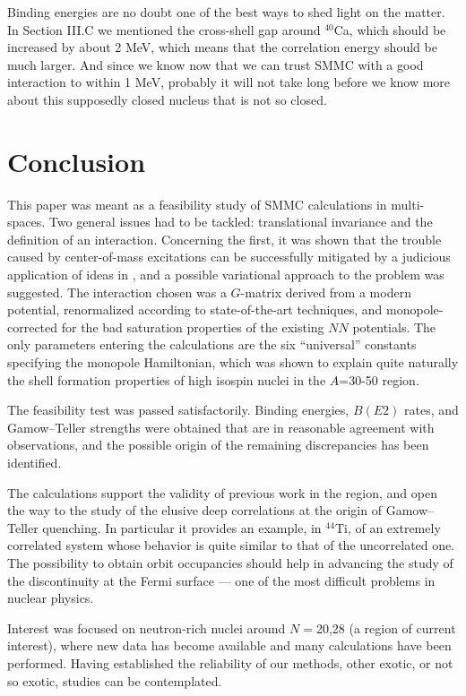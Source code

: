 \begin{multicols}{2}
Binding energies are no doubt one of the best ways to shed light
on the matter. In Section III.C we mentioned the
cross-shell gap around $^{40}$Ca, which should be increased by about
2 MeV, which means that the correlation energy should be much larger.
And since we know now that we can trust SMMC with a good interaction
to within 1 MeV, probably it will not take long before we know more
about this supposedly closed nucleus that is not so closed.

\section{Conclusion}

This paper was meant as a feasibility study of SMMC calculations in
multi-\hw spaces. Two general issues had to be tackled: translational
invariance and the definition of an interaction. Concerning the first,
it was shown that the trouble caused by center-of-mass excitations can
be successfully mitigated by a judicious application of ideas in
\cite{r:whitehead}, and a possible variational approach to the problem
was suggested. The interaction chosen was a $G$-matrix derived from a
modern potential, renormalized according to state-of-the-art
techniques, and monopole-corrected for the bad saturation properties
of the existing $NN$ potentials. The only parameters entering the
calculations are the six ``universal'' constants specifying the
monopole Hamiltonian, which was shown to explain quite naturally the
shell formation properties of high isospin nuclei in the $A$=30-50
region.

The feasibility test was passed satisfactorily. Binding energies,
$B(E2)$ rates, and Gamow--Teller strengths were obtained that are in
reasonable agreement with observations, and the possible origin of the
remaining discrepancies has been identified.

The calculations support the validity of previous work in the region,
and open the way to the study of the elusive deep correlations at the
origin of Gamow--Teller quenching. In particular it provides an
example, in $^{44}$Ti, of an extremely correlated system whose
behavior is quite similar to that of the uncorrelated one. The
possibility to obtain orbit occupancies should help in advancing the
study of the discontinuity at the Fermi surface --- one of the most
difficult problems in nuclear physics.

Interest was focused on neutron-rich nuclei around $N=$20,28 (a region
of current interest), where new data has become available and many
calculations have been performed. Having established the reliability
of our methods, other exotic, or not so exotic, studies can be
contemplated.



\end{multicols}
